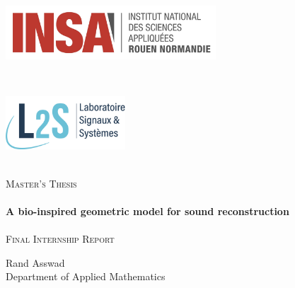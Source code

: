 \begin{titlepage}
    \begin{sffamily}
        \begin{center}
            \begin{minipage}[c]{0.45\textwidth}
            \raggedright\includegraphics[height=2cm]{img/logo_insa.png}
            \end{minipage}~\hfill~%
            \begin{minipage}[c]{0.45\textwidth}
            \raggedleft\includegraphics[height=2cm]{img/logo_l2s.png}
            \end{minipage}\\[2cm]

            \textsc{\huge Master's Thesis}\\[1cm]

            \HRule \\[0.4cm]
            {\huge \bfseries A bio-inspired geometric model for sound reconstruction \\[0.4cm]}
            \HRule \\[1cm]
            
            \textsc{\huge Final Internship Report}\\[1cm]

            \vfill

            \begin{minipage}{\textwidth}
            \begin{center}\Large
                Rand Asswad\\
                Department of Applied Mathematics
            \end{center}
            \end{minipage} \\[2cm]


\end{center}
\end{sffamily}
\end{titlepage}
